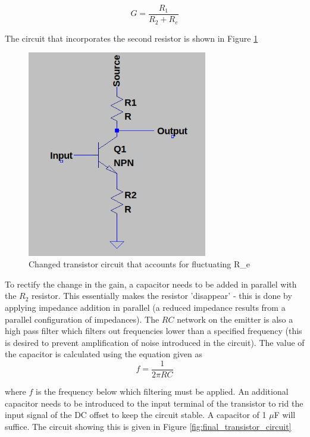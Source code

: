 \documentclass[12pt, a4paper]{article}
\begin{document}
 	\begin{equation}
 		G = \frac{R_1}{R_2 + R_e}
 	\end{equation} 

 	The circuit that incorporates the second resistor is shown in Figure \ref{fig:transistor_configuration_circuit_added_R2}

 	\begin{figure}[H]
 		\centering
		\includegraphics[width=0.7\textwidth]{images/transistor_configuration_circuit_added_R2.png}
		\caption{Changed transistor circuit that accounts for fluctuating R\_e}
		\label{fig:transistor_configuration_circuit_added_R2}
 	\end{figure}

 	To rectify the change in the gain, a capacitor needs to be added in parallel with the $R_2$ resistor. This essentially makes the resistor 'disappear' - this is done by applying impedance addition in parallel (a reduced impedance results from a parallel configuration of impedances). The $RC$ network on the emitter is also a high pass filter which filters out frequencies lower than a specified frequency (this is desired to prevent amplification of noise introduced in the circuit). The value of the capacitor is calculated using the equation given as 
 	\begin{equation}
 	 	f = \frac{1}{2\pi RC}
 	\end{equation}

 	where $f$ is the frequency below which filtering must be applied. An additional capacitor needs to be introduced to the input terminal of the transistor to rid the input signal of the DC offset to keep the circuit stable. A capacitor of 1 $\mu$F will suffice. The circuit showing this is given in Figure \ref{fig:final_transistor_circuit}
\end{document}
